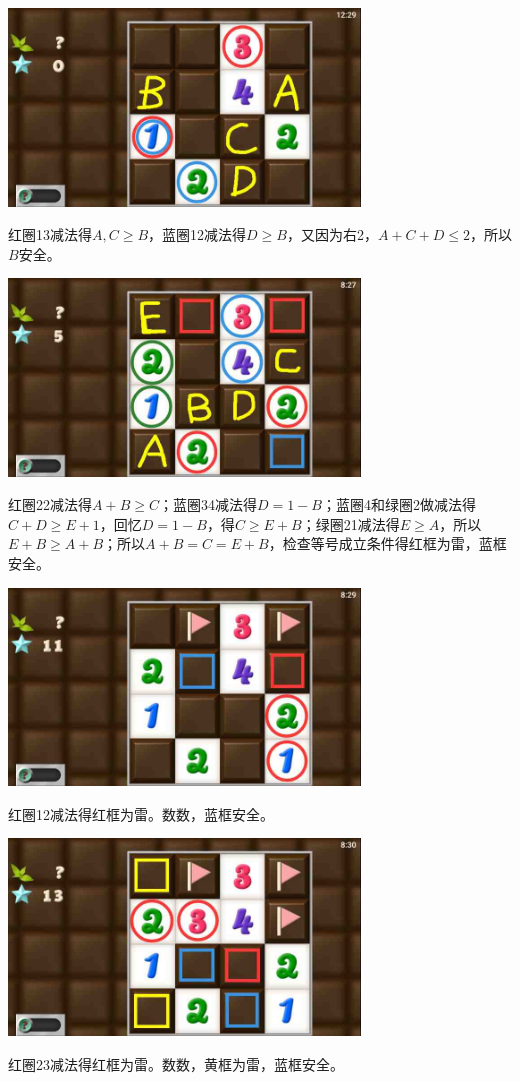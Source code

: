 \subsection{} %
\begin{center}
    \includegraphics[width=0.7\textwidth]{puzzlelow/173-1.jpg}
\end{center}
红圈13减法得$A,C\ge B$，蓝圈12减法得$D\ge B$，又因为右2，$A+C+D\le 2$，所以$B$安全。
\begin{center}
    \includegraphics[width=0.7\textwidth]{puzzlelow/173-2.jpg}
\end{center}
红圈22减法得$A+B\ge C$；蓝圈34减法得$D=1-B$；蓝圈4和绿圈2做减法得$C+D\ge E+1$，回忆$D=1-B$，得$C\ge E+B$；绿圈21减法得$E\ge A$，所以$E+B\ge A+B$；所以$A+B=C=E+B$，检查等号成立条件得红框为雷，蓝框安全。
\begin{center}
    \includegraphics[width=0.7\textwidth]{puzzlelow/173-3.jpg}
\end{center}
红圈12减法得红框为雷。数数，蓝框安全。
\begin{center}
    \includegraphics[width=0.7\textwidth]{puzzlelow/173-4.jpg}
\end{center}
红圈23减法得红框为雷。数数，黄框为雷，蓝框安全。


